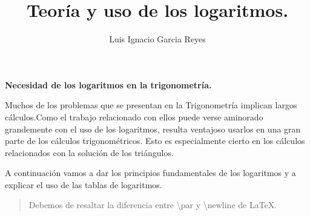 \documentclass{article}
\begin{document}
\title{Teor\'ia y uso de los logaritmos.}
\author{Luis Ignacio Garcia Reyes}

\maketitle

\textbf{Necesidad de los logaritmos en la trigonometr\'ia.}\par
Muchos de los problemas que se presentan en la Trigonometr\'ia implican largos c\'alculos.\newline Como el trabajo relacionado con ellos puede verse aminorado grandemente con el uso de los logaritmos, resulta ventajoso usarlos en una gran parte de los c\'alculos trigonom\'etricos.
Esto es  especialmente cierto en los c\'alculos relacionados con la soluci\'on de los tri\'angulos.\par A continuaci\'on vamos a dar los principios fundamentales de los logaritmos y a explicar el uso de las tablas de logaritmos.
\begin{quote}
Debemos de resaltar la diferencia entre \textbackslash par y \textbackslash newline de \LaTeX.
\end{quote}
\end{document}
